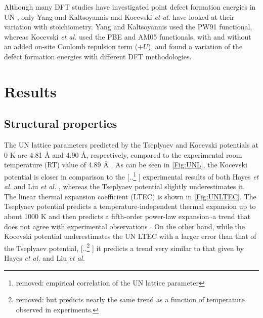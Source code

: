 \documentclass[preprint, 12pt]{elsarticle}
\providecommand{\DIFaddtex}[1]{{\protect\color{blue} \sf #1}} %
\providecommand{\DIFdeltex}[1]{{\protect\color{red} [..\footnote{removed: #1} ]}} %
\providecommand{\DIFaddbegin}{} %
\providecommand{\DIFaddend}{} %
\providecommand{\DIFdelbegin}{} %
\providecommand{\DIFdelend}{} %
\providecommand{\DIFadd}[1]{\texorpdfstring{\DIFaddtex{#1}}{#1}} %
\providecommand{\DIFdel}[1]{\texorpdfstring{\DIFdeltex{#1}}{}} %
\newcommand{\DIFscaledelfig}{0.5}
\newlength{\DIFdelgraphicswidth} %
\newlength{\DIFdelgraphicsheight} %
\newcommand{\DIFaddincludegraphics}[2][]{{\color{blue}\fbox{\DIFOincludegraphics[#1]{#2}}}} %
\newcommand{\DIFdelincludegraphics}[2][]{%
\sbox{\DIFdelgraphicsbox}{\DIFOincludegraphics[#1]{#2}}%
\settoboxwidth{\DIFdelgraphicswidth}{\DIFdelgraphicsbox} %
\settoboxtotalheight{\DIFdelgraphicsheight}{\DIFdelgraphicsbox} %
\scalebox{\DIFscaledelfig}{%
\parbox[b]{\DIFdelgraphicswidth}{\usebox{\DIFdelgraphicsbox}\\[-\baselineskip] \rule{\DIFdelgraphicswidth}{0em}}\llap{\resizebox{\DIFdelgraphicswidth}{\DIFdelgraphicsheight}{%
\setlength{\unitlength}{\DIFdelgraphicswidth}%
\begin{picture}(1,1)%
\thicklines\linethickness{2pt} %
{\color[rgb]{1,0,0}\put(0,0){\framebox(1,1){}}}%
{\color[rgb]{1,0,0}\put(0,0){\line( 1,1){1}}}%
{\color[rgb]{1,0,0}\put(0,1){\line(1,-1){1}}}%
\end{picture}%
}\hspace*{3pt}}} %
} %
\DeclareRobustCommand{\DIFaddbegin}{\DIFOaddbegin \let\includegraphics\DIFaddincludegraphics} %
\DeclareRobustCommand{\DIFaddend}{\DIFOaddend \let\includegraphics\DIFOincludegraphics} %
\DeclareRobustCommand{\DIFdelbegin}{\DIFOdelbegin \let\includegraphics\DIFdelincludegraphics} %
\DeclareRobustCommand{\DIFdelend}{\DIFOaddend \let\includegraphics\DIFOincludegraphics} %
\begin{document}
Although many DFT studies have investigated point defect formation energies in UN \cite{Kotomin2007, Bocharov2011, Lan2013, Kuksin2016, Tseplyaev2016, Kocevski2022II}, only Yang and Kaltsoyannis \cite{Yang2021} and Kocevski \textit{et al.} \cite{Kocevski2022I} have looked at their variation with stoichiometry. Yang and Kaltsoyannis used the PW91 functional, whereas Kocevski \textit{et al.} used the PBE and AM05 functionals, with and without an added on-site Coulomb repulsion term ($+U$), and found a variation of the defect formation energies with different DFT methodologies.

\section{Results}

\subsection{Structural properties}

The UN lattice parameters predicted by the Tseplyaev and Kocevski potentials at 0 K are 4.81 {\AA} and 4.90 {\AA}, respectively, compared to the experimental room temperature (RT) value of 4.89 {\AA} \cite{Hayes1990I}. As can be seen in \cref{Fig:UNL}, the Kocevski potential is closer in comparison to the \DIFdelbegin \DIFdel{empirical correlation of the UN lattice parameter}\DIFdelend \DIFaddbegin \DIFadd{experimental results of both Hayes \textit{et al.} \cite{Hayes1990I} and Liu \textit{et al.} \cite{Liu2023}}\DIFaddend , whereas the Tseplyaev potential slightly underestimates it. The linear thermal expansion coefficient (LTEC) is shown in \cref{Fig:UNLTEC}. The Tseplyaev potential predicts a temperature-independent thermal expansion up to about 1000 K and then predicts a fifth-order power-law expansion--a trend that does not agree with experimental observations\DIFaddbegin \DIFadd{. On the other hand}\DIFaddend , while the Kocevski potential underestimates the UN LTEC with a larger error than that of the Tseplyaev potential, \DIFdelbegin \DIFdel{but predicts nearly the same trend as a function of temperature observed in experiments.
}\DIFdelend \DIFaddbegin \DIFadd{it predicts a trend very similar to that given by Hayes \textit{et al.} and Liu \textit{et al.}
}\DIFaddend 
\end{document}
